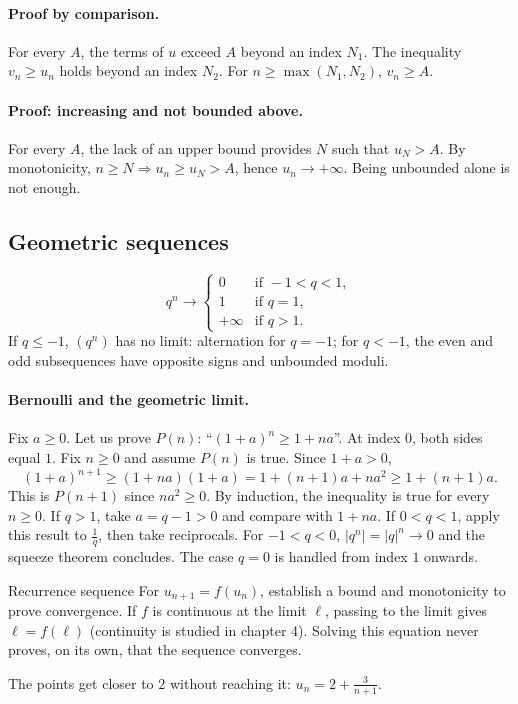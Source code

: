 \paragraph{Proof by comparison.} For every $A$, the terms of $u$ exceed $A$ beyond an index $N_1$. The inequality $v_n\ge u_n$ holds beyond an index $N_2$. For $n\ge\max(N_1,N_2)$, $v_n\ge A$.
\paragraph{Proof: increasing and not bounded above.} For every $A$, the lack of an upper bound provides $N$ such that $u_N>A$. By monotonicity, $n\ge N\Rightarrow u_n\ge u_N>A$, hence $u_n\to+\infty$. Being unbounded alone is not enough.
\subsection{Geometric sequences}
\[q^n\longrightarrow\begin{cases}0&\text{if }-1<q<1,\\1&\text{if }q=1,\\+\infty&\text{if }q>1.\end{cases}\]
If $q\le-1$, $(q^n)$ has no limit: alternation for $q=-1$; for $q<-1$, the even and odd subsequences have opposite signs and unbounded moduli.
\paragraph{Bernoulli and the geometric limit.} Fix $a\ge0$. Let us prove $P(n)$: ``$(1+a)^n\ge1+na$''. At index $0$, both sides equal $1$.
Fix $n\ge0$ and assume $P(n)$ is true. Since $1+a>0$,
\[(1+a)^{n+1}\ge(1+na)(1+a)=1+(n+1)a+na^2\ge1+(n+1)a.\]
This is $P(n+1)$ since $na^2\ge0$. By induction, the inequality is true for every $n\ge0$. If $q>1$, take $a=q-1>0$ and compare with $1+na$. If $0<q<1$, apply this result to $\frac{1}{q}$, then take reciprocals. For $-1<q<0$, $|q^n|=|q|^n\to0$ and the squeeze theorem concludes. The case $q=0$ is handled from index $1$ onwards.
\begin{methode}{Recurrence sequence}
For $u_{n+1}=f(u_n)$, establish a bound and monotonicity to prove convergence. If $f$ is continuous at the limit $\ell$, passing to the limit gives $\ell=f(\ell)$ (continuity is studied in chapter 4). Solving this equation never proves, on its own, that the sequence converges.
\end{methode}


\begin{center}\par\small The points get closer to $2$ without reaching it: $u_n=2+\frac{3}{n+1}$.\end{center}

